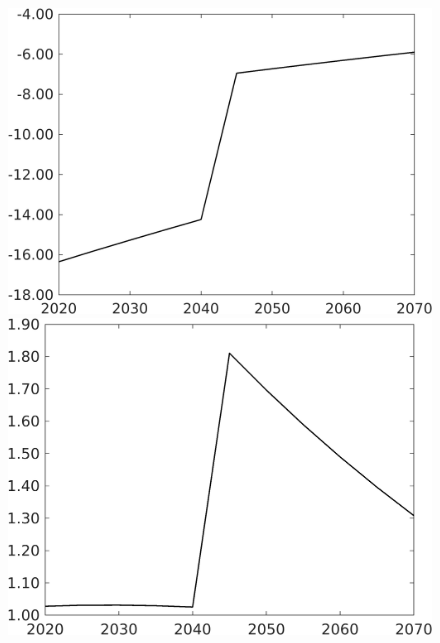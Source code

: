 \documentclass[12pt]{article}
\begin{document}
\begin{figure}[h!!]
\begin{minipage}[]{0.32\textwidth}
	\end{minipage}		
	\begin{minipage}[]{0.32\textwidth}
		\includegraphics[width=1\textwidth]{../../codding_model/own_basedOnFried/optimalPol_010922_revision/figures/all_13Sept22/CompTaufPER_bytaul_Reg0_gAg_spillover0_nsk0_xgr0_knspil1_sep0_LFlimit1_emsbase0_countec0_GovRev0_etaa0.79_lgd0.png}
	\end{minipage}
	\begin{minipage}[]{0.32\textwidth}
		\includegraphics[width=1\textwidth]{../../codding_model/own_basedOnFried/optimalPol_010922_revision/figures/all_13Sept22/CompTaufPER_bytaul_Reg0_gAn_spillover0_nsk0_xgr0_knspil1_sep0_LFlimit1_emsbase0_countec0_GovRev0_etaa0.79_lgd0.png}

\end{minipage}
\end{figure}
\end{document}
